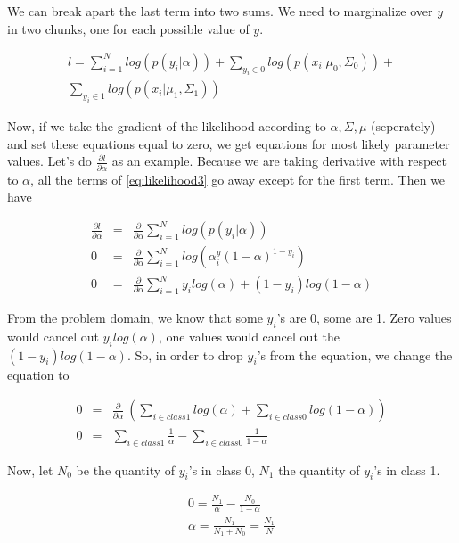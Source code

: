 \documentclass{ecctd01} %
\begin{document}
We can break apart the last term into two sums. We need to marginalize over $y$
in two chunks, one for each possible value of $y$.  

\begin{eqnarray}
  \label{eq:likelihood3}
  l = \sum_{i=1}^N log(p(y_{i}|\alpha)) + 
  \sum_{y_{i}\in 0} log(p(x_{i}|\mu_{0},\Sigma_{0})) + \nonumber \\
  \sum_{y_{i}\in 1} log(p(x_{i}|\mu_{1},\Sigma_{1}))
\end{eqnarray}

Now, if we take the gradient of the likelihood according to $\alpha, \Sigma,
\mu$ (seperately) and set these equations equal to zero, we get equations for
most likely parameter values. Let's do $\frac{\partial l}{\partial
  \alpha}$ as an example. Because we are taking derivative with respect to
$\alpha$, all the terms of \eqref{eq:likelihood3} go away except for
the first term. Then we have

\begin{eqnarray}
  \label{eq:likelihood4}
  \frac{\partial l}{\partial \alpha} &=&
  \frac{\partial }{\partial \alpha}
  \sum_{i=1}^N log (p(y_{i}|\alpha))  \nonumber \\
  0 &=&
  \frac{\partial}{\partial \alpha}
  \sum_{i=1}^N log\left(\alpha^y_{i}(1-\alpha)^{1-y_{i}}\right) \nonumber \\
  0 &=&
  \frac{\partial}{\partial \alpha}
  \sum_{i=1}^N y_{i}log(\alpha) + (1-y_{i})log(1-\alpha) \nonumber
\end{eqnarray}

From the problem domain, we know that some $y_{i}$'s are 0, some are
1. Zero values would cancel out $y_{i}log(\alpha)$, one values would
cancel out the $(1-y_{i})log(1-\alpha)$. So, in order to drop
$y_{i}$'s from the equation, we change the equation to  

\begin{eqnarray}
  \label{eq:likelihood5}
  0 &=&
  \frac{\partial}{\partial \alpha}\
  \left(
  \sum_{i\in class1} log(\alpha) +
  \sum_{i\in class0} log(1-\alpha)
  \right)
  \nonumber \\
  0 &=&
  \sum_{i\in class1}\frac{1}{\alpha} -
  \sum_{i\in class0}\frac{1}{1-\alpha} \nonumber
\end{eqnarray}

Now, let $N_{0}$ be the quantity of $y_{i}$'s in class 0, $N_{1}$ the
quantity of $y_{i}$'s in class 1. 

\begin{eqnarray}
  \label{eq:likelihood6}
  0 = \frac{N_{1}}{\alpha}-\frac{N_{0}}{1-\alpha} \nonumber \\
  \alpha = \frac{N_{1}}{N_{1}+N_{0}} = \frac{N_{1}}{N}\nonumber
\end{eqnarray}
\end{document}
